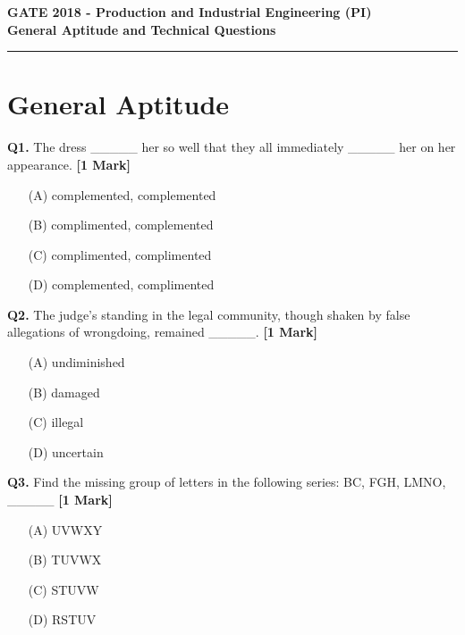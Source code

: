 \documentclass[11pt]{article}
\newcommand{\questiona}[2]{
    \noindent\textbf{Q#2.} #1 \hfill \textbf{[1 Mark]}
}
\begin{document}
\begin{center}
    \Large\textbf{GATE 2018 - Production and Industrial Engineering (PI)} \\
    \large\textbf{General Aptitude and Technical Questions} \\
    \rule{\textwidth}{0.5pt} %
\end{center}

\vspace{0.5cm}

\section*{General Aptitude}

\questiona{The dress \_\_\_\_\_ her so well that they all immediately \_\_\_\_\_ her on her appearance.}{1}
\begin{enumerate}
    \item[(A)] complemented, complemented
    \item[(B)] complimented, complemented
    \item[(C)] complimented, complimented
    \item[(D)] complemented, complimented
\end{enumerate}
\vspace{0.5cm}

\questiona{The judge’s standing in the legal community, though shaken by false allegations of wrongdoing, remained \_\_\_\_\_.}{2}
\begin{enumerate}
    \item[(A)] undiminished
    \item[(B)] damaged
    \item[(C)] illegal
    \item[(D)] uncertain
\end{enumerate}
\vspace{0.5cm}

\questiona{Find the missing group of letters in the following series: BC, FGH, LMNO, \_\_\_\_\_}{3}
\begin{enumerate}
    \item[(A)] UVWXY
    \item[(B)] TUVWX
    \item[(C)] STUVW
    \item[(D)] RSTUV
\end{enumerate}
\vspace{0.5cm}
\end{document}

